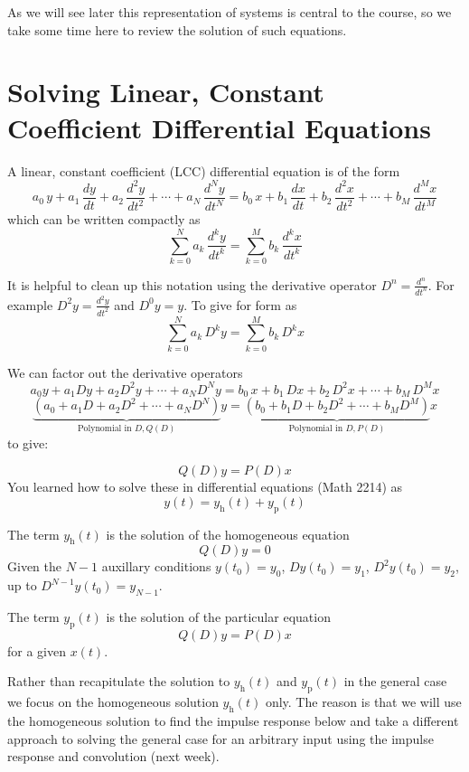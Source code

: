 As we will see later this representation of systems is central to the course, so we take some time here to review the solution of such equations.
 
\section{Solving Linear, Constant Coefficient Differential Equations}

A linear, constant coefficient (LCC) differential equation is of the form
\[
a_0\, y + a_1\, \frac{dy}{dt} + a_2\, \frac{d^2y}{dt^2} + \cdots + a_N\, \frac{d^Ny}{dt^N}  = b_0\, x + b_1\, \frac{dx}{dt} + b_2\, \frac{d^2x}{dt^2} + \cdots + b_M\, \frac{d^Mx}{dt^M}
\]
which can be written compactly as
\[
\sum\limits_{k = 0}^{N} a_k\, \frac{d^ky}{dt^k} = \sum\limits_{k = 0}^{M} b_k\, \frac{d^kx}{dt^k}
\]

It is helpful to clean up this notation using the derivative operator $D^n = \frac{d^n}{dt^n}$. For example
$D^2y = \frac{d^2y}{dt^2}$ and $D^0 y= y$. To give for form as
\[
\sum\limits_{k = 0}^{N} a_k\, D^k y = \sum\limits_{k = 0}^{M} b_k\, D^k x
\]

We can factor out the derivative operators
\[
a_0y + a_1Dy + a_2D^2y + \cdots + a_ND^Ny  = b_0\, x + b_1\, Dx + b_2\, D^2x + \cdots + b_M\, D^M x
\]
\[
\underbrace{\left(a_0 + a_1D + a_2D^2 + \cdots + a_ND^N\right)}_{\text{Polynomial in } D, Q(D)} y = \underbrace{\left(b_0 + b_1 D + b_2 D^2 + \cdots + b_M D^M\right)}_{\text{Polynomial in } D, P(D)} x
\]
to give:
  
\[
Q(D)y = P(D)x
\]
You learned how to solve these in differential equations (Math 2214) as
\[
y(t) = y_\text{h}(t) + y_\text{p}(t)
\]

The term $y_\text{h}(t)$ is the solution of the homogeneous equation
\[
Q(D)y = 0
\]
Given the $N-1$ auxillary conditions $y(t_0) = y_0$, $Dy(t_0) = y_1$, $D^2y(t_0) = y_2$, up to $D^{N-1}y(t_0) = y_{N-1}$.

The term $y_\text{p}(t)$ is the solution of the particular equation
\[
Q(D)y = P(D)x
\]
for a given $x(t)$.

Rather than recapitulate the solution to $y_\text{h}(t)$ and $y_\text{p}(t)$ in the general case we focus on the homogeneous solution $y_\text{h}(t)$ only. The reason is that we will use the homogeneous solution to find the impulse response below and take a different approach to solving the general case for an arbitrary input using the impulse response and convolution (next week).

